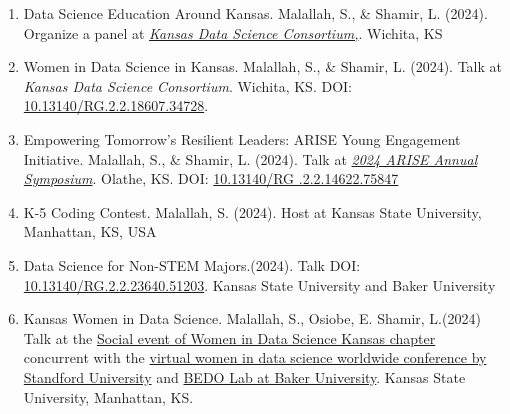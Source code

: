 \documentclass[11pt]{article}
\begin{document}
\begin{enumerate}
 
\item  Data Science Education Around Kansas. Malallah, S., \& Shamir, L. (2024). Organize a panel at \textit{ \href{https://data.ku.edu/kdscon2024}{Kansas Data Science Consortium,}}. Wichita, KS {\href{https://www.linkedin.com/posts/safiamalallah_kansasdatascience-datascienceeducation-womenindatascience-activity-7190988975367417857-htmg?utm_source=share&utm_medium=member_desktop}{\color{icnclr} \faGlobe[regular] }} 

\item  Women in Data Science in Kansas. Malallah, S., \& Shamir, L. (2024). Talk at \textit{Kansas Data Science Consortium}. Wichita, KS. DOI: \href{https://doi.org/10.13140/RG.2.2.18607.34728}{10.13140/RG.2.2.18607.34728}. 

\item  Empowering Tomorrow's Resilient Leaders: ARISE Young Engagement Initiative. Malallah, S., \& Shamir, L. (2024). Talk at \textit{\href{https://www.linkedin.com/posts/safiamalallah_ariseconference-kdsc-activity-7185007409768095744-uVWI?utm_source=share&utm_medium=member_desktop}{2024 ARISE Annual Symposium}}. Olathe, KS. DOI: \href{https://doi.org/10.13140/RG.2.2.14622.75847}{10.13140/RG .2.2.14622.75847} 

\item K-5 Coding Contest. Malallah, S. (2024). Host at  Kansas State University, Manhattan, KS, USA {\href{https://www.linkedin.com/posts/safiamalallah_although-its-a-little-late-i-am-thrilled-activity-7199213583623233536-0Wp-?utm_source=share&utm_medium=member_desktop}{\color{icnclr} \faGlobe[regular] }} 
 

\item Data Science for Non-STEM Majors.(2024). Talk DOI: \href{https://doi.org/10.13140/RG.2.2.23640.51203}{10.13140/RG.2.2.23640.51203}. Kansas State University and Baker University


\item Kansas Women in Data Science. Malallah, S., Osiobe, E. Shamir, L.(2024) Talk at the \href{https://www.linkedin.com/posts/safiamalallah_wids2024-activity-7171923711581798400-Q8-v?utm_source=share&utm_medium=member_desktop}{Social event of  Women in Data Science Kansas chapter} concurrent with the 
\href{https://www.youtube.com/watch?v=H4F_1RXwKmE&list=PLHAk3jHXWpxLDtsmXXNw-H1gLLNBZQGaG}{virtual women in data science worldwide conference by Standford University} and \href{https://www.bakeru.edu/bedo/}{BEDO Lab at Baker University}. Kansas State University, Manhattan, KS.    


\end{enumerate}
\end{document}

